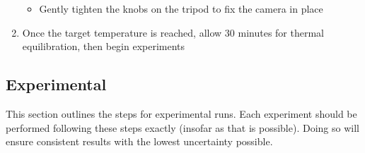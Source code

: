 \documentclass[letterpaper,11pt]{article}
\begin{document}
\begin{enumerate}
\begin{itemize}
        \item Gently tighten the knobs on the tripod to fix the camera in place
        \end{itemize}
    
    \item Once the target temperature is reached, allow 30 minutes for thermal 
        equilibration, then begin experiments
    \end{enumerate}
    
\subsection{Experimental}
This section outlines the steps for experimental runs. Each experiment should be
performed following these steps exactly (insofar as that is possible). Doing so
will ensure consistent results with the lowest uncertainty possible.
\end{document}
